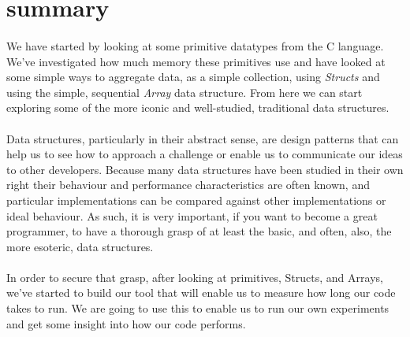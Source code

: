 \documentclass[10pt, a4paper, twosize]{article}
\begin{document}
\section{summary}
\paragraph{} We have started by looking at some primitive datatypes from the C language. We've investigated how much memory these primitives use and have looked at some simple ways to aggregate data, as a simple collection, using \emph{Structs} and using the simple, sequential \emph{Array} data structure. From here we can start exploring some of the more iconic and well-studied, traditional data structures.

\paragraph{} Data structures, particularly in their abstract sense, are design patterns that can help us to see how to approach a challenge or enable us to communicate our ideas to other developers. Because many data structures have been studied in their own right their behaviour and performance characteristics are often known, and particular implementations can be compared against other implementations or ideal behaviour. As such, it is very important, if you want to become a great programmer, to have a thorough grasp of at least the basic, and often, also, the more esoteric, data structures.

\paragraph{} In order to secure that grasp, after looking at primitives, Structs, and Arrays, we've started to build our tool that will enable us to measure how long our code takes to run. We are going to use this to enable us to run our own experiments and get some insight into how our code performs.







\end{document}
